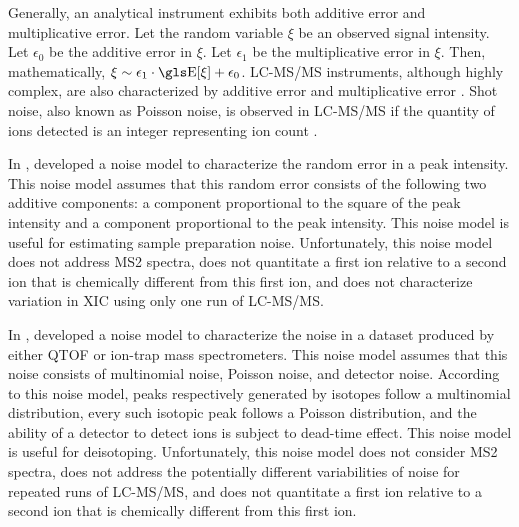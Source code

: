 Generally, an analytical instrument exhibits both additive error and multiplicative error.
Let the random variable \(\xi\) be an observed signal intensity.
Let \(\epsilon_0\) be the additive error in \(\xi\).
Let \(\epsilon_1\) be the multiplicative error in \(\xi\).
Then, mathematically, \(\xi\sim\epsilon_1\cdot \E[\xi]+\epsilon_0\).
\gls{LC-MS/MS} instruments, although highly complex, are also characterized by additive error and multiplicative error \cite{karp2010addressing}.
Shot noise, also known as Poisson noise, is observed in \gls{LC-MS/MS} if the quantity of ions detected is an integer representing ion count \cite{anderle2004quantifying,du2008noise}.

In \citeyear{anderle2004quantifying}, 
	\citet{anderle2004quantifying} developed a noise model to characterize the random error in a peak intensity.
This noise model assumes that this random error consists of the following two additive components:
	a component proportional to the square of the peak intensity and a component proportional to the peak intensity.
This noise model is useful for estimating sample preparation noise.{}	
Unfortunately, 
	this noise model does not address \gls{MS2} spectra, 
	does not quantitate a first ion relative to a second ion that is chemically different from this first ion,
	and does not characterize variation in \gls{XIC} using only one run of \gls{LC-MS/MS}.
	
In \citeyear{du2008noise}, 
	\citet{du2008noise} developed a noise model to characterize the noise in a dataset produced by either \gls{QTOF} or ion-trap mass spectrometers.
This noise model assumes that this noise consists of multinomial noise, Poisson noise, and detector noise.{} 
According to this noise model, 
	peaks respectively generated by isotopes follow a multinomial distribution, 
	every such isotopic peak follows a Poisson distribution,
	and the ability of a detector to detect ions is subject to dead-time effect.
This noise model is useful for deisotoping.{}
Unfortunately,
	this noise model does not consider \gls{MS2} spectra, %
	does not address the potentially different variabilities of noise for {repeated} runs of \gls{LC-MS/MS},
	and does not quantitate a first ion relative to a second ion that is chemically different from this first ion.
	
